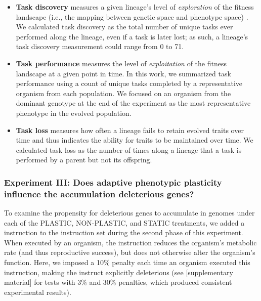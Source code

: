 \begin{itemize}

\item \textbf{Task discovery} measures a given lineage's level of \textit{exploration} of the fitness landscape (i.e., the mapping between genetic space and phenotype space) \citep{canino-koning_fluctuating_2019}. 
We calculated task discovery as the total number of unique tasks ever performed along the lineage, even if a task is later lost; as such, a lineage's task discovery measurement could range from 0 to 71.

\item \textbf{Task performance} measures the level of \textit{exploitation} of the fitness landscape at a given point in time.
In this work, we summarized task performance using a count of unique tasks completed by a representative organism from each population.
We focused on an organism from the dominant genotype at the end of the experiment as the most representative phenotype in the evolved population.

\item \textbf{Task loss} measures how often a lineage fails to retain evolved traits over time and thus indicates the ability for traits to be maintained over time.
We calculated task loss as the number of times along a lineage that a task is performed by a parent but not its offspring. 

\end{itemize}

\vspace{0.5cm}
\subsubsection{Experiment III: Does adaptive phenotypic plasticity influence the accumulation deleterious genes?}
\label{sec:methods:experiment-deleterious-hitchhiking}

To examine the propensity for deleterious genes to accumulate in genomes under each of the PLASTIC, NON-PLASTIC, and STATIC treatments, we added a  instruction to the instruction set during the second phase of this experiment.
When executed by an organism, the  instruction reduces the organism's metabolic rate (and thus reproductive success), but does not otherwise alter the organism's function.
Here, we imposed a 10\% penalty each time an organism executed this instruction, making the instruct explicitly deleterious (see [supplementary material] for tests with 3\% and 30\% penalties, which produced consistent experimental results).

